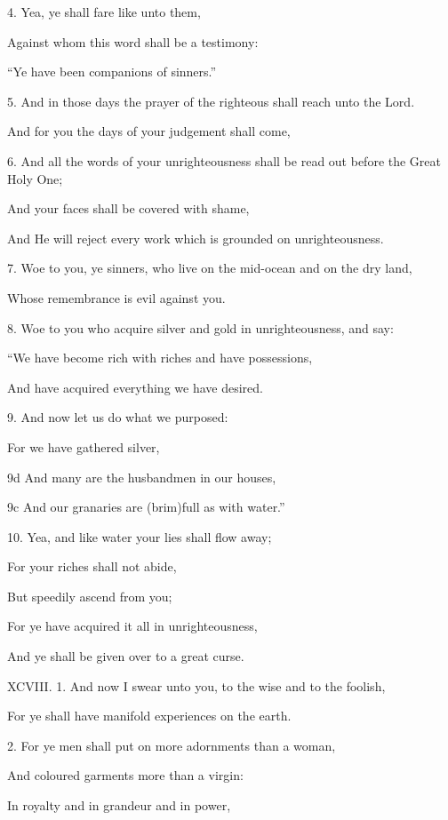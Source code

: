 4. Yea, ye shall fare like unto them,

Against whom this word shall be a testimony:

“Ye have been companions of sinners.”

5. And in those days the prayer of the righteous shall reach unto the Lord.

And for you the days of your judgement shall come,

6. And all the words of your unrighteousness shall be read out before the Great Holy One;

And your faces shall be covered with shame,

And He will reject every work which is grounded on unrighteousness.

7. Woe to you, ye sinners, who live on the mid-ocean and on the dry land,

Whose remembrance is evil against you.

8. Woe to you who acquire silver and gold in unrighteousness, and say:

“We have become rich with riches and have possessions,

And have acquired everything we have desired.

9. And now let us do what we purposed:

For we have gathered silver,

9d And many are the husbandmen in our houses,

9c And our granaries are (brim)full as with water.”

10. Yea, and like water your lies shall flow away;

For your riches shall not abide,

But speedily ascend from you;

For ye have acquired it all in unrighteousness,

And ye shall be given over to a great curse.


XCVIII. 1. And now I swear unto you, to the wise and to the foolish,

For ye shall have manifold experiences on the earth.

2. For ye men shall put on more adornments than a woman,

And coloured garments more than a virgin:

In royalty and in grandeur and in power,

